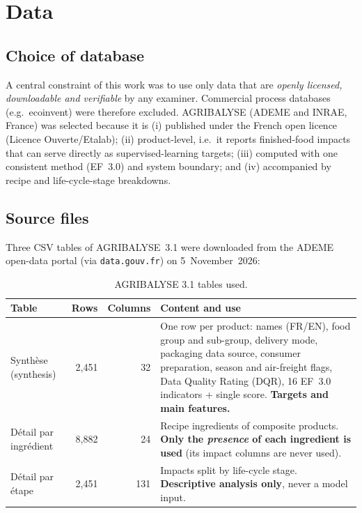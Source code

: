 \chapter{Data}
\label{ch:data}

\section{Choice of database}

A central constraint of this work was to use only data that are \emph{openly licensed,
downloadable and verifiable} by any examiner. Commercial process databases (e.g.\ ecoinvent) were
therefore excluded. AGRIBALYSE (ADEME and INRAE, France) \citep{agribalyse2020,agribalyse31} was
selected because it is (i) published under the French open licence (Licence Ouverte/Etalab);
(ii) product-level, i.e.\ it reports finished-food impacts that can serve directly as
supervised-learning targets; (iii) computed with one consistent method (EF~3.0) and system
boundary; and (iv) accompanied by recipe and life-cycle-stage breakdowns.

\section{Source files}

Three CSV tables of AGRIBALYSE~3.1 were downloaded from the ADEME open-data portal (via
\texttt{data.gouv.fr}) on 5~November~2026:

\begin{table}[ht]
\centering\small
\caption{AGRIBALYSE 3.1 tables used.}
\label{tab:files}
\begin{tabularx}{\textwidth}{@{}lrrX@{}}
\toprule
Table & Rows & Columns & Content and use \\
\midrule
Synthèse (synthesis) & 2{,}451 & 32 & One row per product: names (FR/EN), food group and sub-group,
delivery mode, packaging data source, consumer preparation, season and air-freight flags, Data
Quality Rating (DQR), 16 EF~3.0 indicators + single score. \textbf{Targets and main features.} \\
Détail par ingrédient & 8{,}882 & 24 & Recipe ingredients of composite products. \textbf{Only the
\emph{presence} of each ingredient is used} (its impact columns are never used). \\
Détail par étape & 2{,}451 & 131 & Impacts split by life-cycle stage. \textbf{Descriptive analysis
only}, never a model input. \\
\bottomrule
\end{tabularx}
\end{table}

